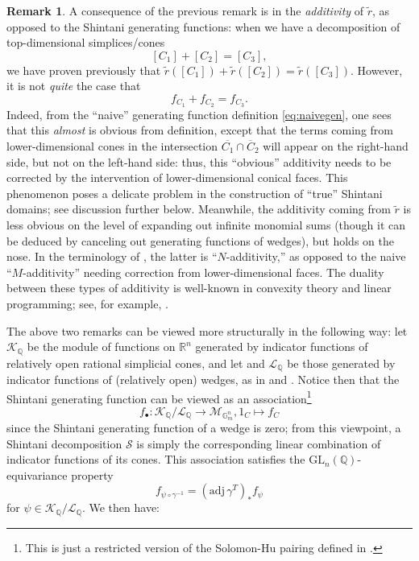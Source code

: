 \documentclass[10pt]{amsart}
\theoremstyle{definition}
\newtheorem{rem}[thm]{Remark}
\newcommand{\Q}{\mathbb{Q}}
\newcommand{\R}{\mathbb{R}}
\newcommand{\G}{\mathbb{G}}
\newcommand{\GL}{\mathrm{GL}}
\numberwithin{equation}{section}
\begin{document}
    \begin{rem}
        A consequence of the previous remark is in the \emph{additivity} of $\widetilde{r}$, as opposed to the Shintani generating functions: when we have a decomposition of top-dimensional simplices/cones 
        \[
        [C_1]+[C_2] = [C_3],
        \]
        we have proven previously that $\widetilde{r}([C_1])+\widetilde{r}([C_2]) = \widetilde{r}([C_3])$. However, it is not \emph{quite} the case that 
        \[
        f_{C_1}+f_{C_2}=f_{C_3}.
        \]
        Indeed, from the ``naive'' generating function definition \eqref{eq:naivegen}, one sees that this \emph{almost} is obvious from definition, except that the terms coming from lower-dimensional cones in the intersection $\overline{C_1}\cap \overline{C}_2$ will appear on the right-hand side, but not on the left-hand side: thus, this ``obvious'' additivity needs to be corrected by the intervention of lower-dimensional conical faces. This phenomenon poses a delicate problem in the construction of ``true'' Shintani domains; see discussion further below. Meanwhile, the additivity coming from $\widetilde{r}$ is less obvious on the level of expanding out infinite monomial sums (though it can be deduced by canceling out generating functions of wedges), but holds on the nose. In the terminology of \cite{GP}, the latter is ``$N$-additivity,'' as opposed to the naive ``$M$-additivity'' needing correction from lower-dimensional faces. The duality between these types of additivity is well-known in convexity theory and linear programming; see, for example, \cite[Chapter 1, Problem 3]{Bv}. 
            \end{rem}


        The above two remarks can be viewed more structurally in the following way: let $\mathcal{K}_\Q$ be the module of functions on $\R^n$ generated by indicator functions of relatively open rational simplicial cones, and let and $\mathcal{L}_\Q$ be those generated by indicator functions of (relatively open) wedges, as in \cite{SH} and \cite{CDG}. Notice then that the Shintani generating function can be viewed as an association\footnote{This is just a restricted version of the Solomon-Hu pairing defined in \cite{SH}.}
        \[
        f_\bullet:\mathcal{K}_\Q/\mathcal{L}_\Q \to \mathcal{M}_{\G_m^n}, 1_{C}\mapsto f_{C}
        \]
        since the Shintani generating function of a wedge is zero; from this viewpoint, a Shintani decomposition $\mathscr{S}$ is simply the corresponding linear combination of indicator functions of its cones. This association satisfies the $\GL_n(\Q)$-equivariance property 
        \[
            f_{\psi \circ \gamma^{-1}} = (\mathrm{adj}\, \gamma^T)_* f_{\psi}
        \]
        for $\psi\in \mathcal{K}_\Q/\mathcal{L}_\Q$. We then have:
\end{document}
